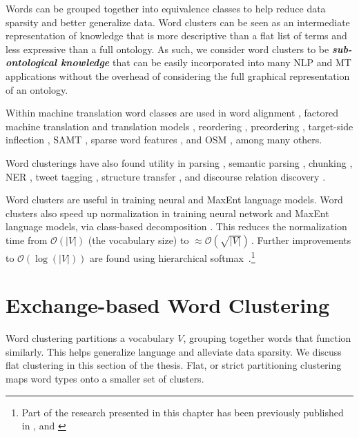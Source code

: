 Words can be grouped together into equivalence classes to help reduce data sparsity and better generalize data. Word clusters can be seen as an intermediate representation of knowledge that is more descriptive than a flat list of terms and less expressive than a full ontology. As such, we consider word clusters to be \textbf{\textit{sub-ontological knowledge}} that can be easily incorporated into many NLP and MT applications without the overhead of considering the full graphical representation of an ontology.

Within machine translation word classes are used in word alignment \citep{brown-etal1993,och-ney2000}, factored machine translation \citep{koehn-hoang2007} and translation models \citep{koehn-hoang2007,wuebker-etal2013}, reordering \citep{cherry2013}, preordering \citep{stymne2012}, target-side inflection \citep{chahuneau-etal2013}, SAMT \citep{zollmann-vogel2011}, sparse word features \citep{haddow-etal2015}, and OSM \citep{durrani-etal2014}, among many others.

Word clusterings have also found utility in parsing \citep{koo-etal2008,candito-seddah2010,kong-etal2014}, semantic parsing \citep{zhao-etal2009}, chunking \citep{turian-etal2010}, NER \citep{miller-etal2004,liang2005,ratinov-roth2009,ritter-etal2011}, tweet tagging \citep{owoputi-etal2013,nooralahzadeh-etal2014}, structure transfer \citep{tackstrom-etal2012}, and discourse relation discovery \citep{rutherford-xue2014}.

Word clusters are useful in training neural and MaxEnt language models. Word clusters also speed up normalization in training neural network and MaxEnt language models, via class-based decomposition \citep{goodman2001a}. This reduces the normalization time from $\mathcal{O}(|V|)$ (the vocabulary size) to $\approx \mathcal{O}(\sqrt{|V|})$\,. Further improvements to $\mathcal{O}(\log(|V|))$ are found using hierarchical softmax \citep{morin-bengio2005,mnih-hinton2009}\,.\footnote{Part of the research presented in this chapter has been previously published in \cite{dehdari-etal2016}, \cite{dehdari-tan-vangenabith:2016:N16-1} and \cite{tan:2016:WAT2016}}

\section{Exchange-based Word Clustering}

Word clustering partitions a vocabulary $V$\!, grouping together words that function similarly. This helps generalize language and alleviate data sparsity. We discuss flat clustering in this section of the thesis. Flat, or strict partitioning clustering maps word types onto a smaller set of clusters.

